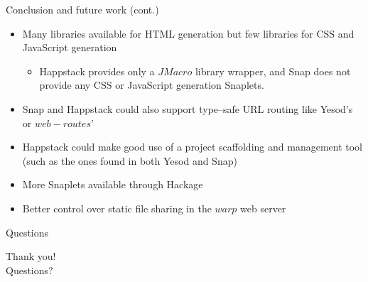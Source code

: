 \documentclass[10pt,usenames,dvipsnames]{beamer}
\begin{document}
	\begin{frame}{Conclusion and future work (cont.)}
	\begin{itemize}
		\item Many libraries available for HTML generation but few libraries for CSS and JavaScript generation
			\begin{itemize}
			\item Happstack provides only a $ JMacro $ library wrapper, and Snap does not provide any CSS or JavaScript generation Snaplets.
			\end{itemize}
	
		\item Snap and Happstack could also support type--safe URL routing like Yesod's or $ web-routes $'
	
		\item Happstack could make good use of a project scaffolding and management tool (such as the ones found in both Yesod and Snap)

		\item More Snaplets available through Hackage
	
		\item Better control over static file sharing in the $ warp $ web server
	\end{itemize}
	\end{frame}
	
	\begin{frame}{Questions}
		\begin{center}
			\large{Thank you!}\\
			\huge{Questions?}
		\end{center}
	\end{frame}
\end{document}
